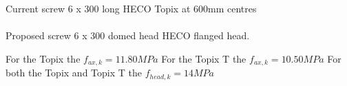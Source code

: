 \documentclass{article}
\begin{document}
Current screw 6 x 300 long HECO Topix at 600mm centres\\ \\
Proposed screw 6 x 300 domed head HECO flanged head.

For the Topix the $f_{ax,k}= 11.80 MPa$
For the Topix T the  $f_{ax,k} = 10.50 MPa$
For both the Topix and Topix T the $f_{head,k} = 14MPa$ 
\end{document}
